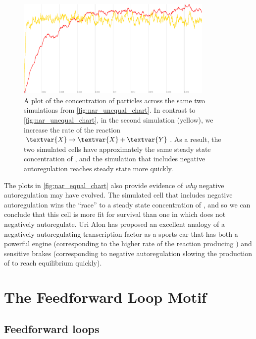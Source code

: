 \begin{figure}[h]
\centering
\mySfFamily
\includegraphics[width = 0.85\textwidth]{../images/cellblender_nar_equal_chart_white.png}
\caption{A plot of the concentration of  particles across the same two simulations from \autoref{fig:nar_unequal_chart}. In contrast to \autoref{fig:nar_unequal_chart}, in the second simulation (yellow), we increase the rate of the reaction $\textvar{X} \rightarrow \textvar{X} + \textvar{Y}$.  As a result, the two simulated cells have approximately the same steady state concentration of , and the simulation that includes negative autoregulation reaches steady state more quickly.}
\label{fig:nar_equal_chart}
\end{figure}

The plots in \autoref{fig:nar_equal_chart} also provide evidence of \textit{why} negative autoregulation may have evolved. The simulated cell that includes negative autoregulation wins the ``race'' to a steady state concentration of , and so we can conclude that this cell is more fit for survival than one in which  does not negatively autoregulate. Uri Alon has proposed an excellent analogy of a negatively autoregulating transcription factor as a sports car that has both a powerful engine (corresponding to the higher rate of the reaction producing ) and sensitive brakes (corresponding to negative autoregulation slowing the production of  to reach equilibrium quickly).\\

\FloatBarrier
{}

\section{The Feedforward Loop Motif}
\label{sec:the_feedforward_loop_motif}

\subsection{Feedforward loops}

